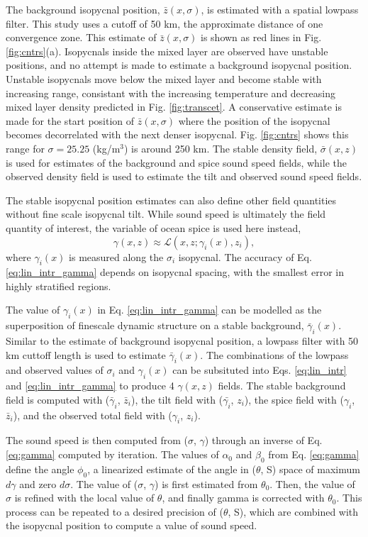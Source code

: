 \documentclass[preprint,NumberedRefs]{JASA}
\begin{document}
The background isopycnal position, $\bar{z}(x, \sigma)$, is estimated with a spatial lowpass filter. This study uses a cutoff of 50 km, the approximate distance of one convergence zone. This estimate of $\bar{z}(x, \sigma)$ is shown as red lines in Fig. \ref{fig:cntrs}(a). Isopycnals inside the mixed layer are observed have unstable positions, and no attempt is made to estimate a background isopycnal position. Unstable isopycnals move below the mixed layer and become stable with increasing range, consistant with the increasing temperature and decreasing mixed layer density predicted in Fig. \ref{fig:transcet}. A conservative estimate is made for the start position of $\bar{z}(x, \sigma)$ where the position of the isopycnal becomes decorrelated with the next denser isopycnal. Fig. \ref{fig:cntrs} shows this range for $\sigma=25.25$ (kg/m$^3$) is around 250 km. The stable density field, $\bar{\sigma}(x,z)$ is used for estimates of the background and spice sound speed fields, while the observed density field is used to estimate the tilt and observed sound speed fields.

The stable isopycnal position estimates can also define other field quantities without fine scale isopycnal tilt. While sound speed is ultimately the field quantity of interest, the variable of ocean spice is used here instead,
\begin{equation}
    \gamma(x, z)\approx\mathcal{L}(x, z; \gamma_i(x), z_i),
    \label{eq:lin_intr_gamma}
\end{equation}
where $\gamma_i(x)$ is measured along the $\sigma_i$ isopycnal. The accuracy of Eq. \eqref{eq:lin_intr_gamma} depends on isopycnal spacing, with the smallest error in highly stratified regions.

The value of $\gamma_i(x)$ in Eq. \eqref{eq:lin_intr_gamma} can be modelled as the superposition of finescale dynamic structure on a stable background, $\bar{\gamma}_i(x)$. Similar to the estimate of background isopycnal position, a lowpass filter with 50 km cuttoff length is used to estimate $\bar{\gamma}_i(x)$. The combinations of the lowpass and observed values of $\sigma_i$ and $\gamma_i(x)$ can be subsituted into Eqs. \eqref{eq:lin_intr} and \eqref{eq:lin_intr_gamma} to produce 4 $\gamma(x,z)$ fields. The stable background field is computed with ($\bar{\gamma}_i$, $\bar{z}_i$), the tilt field with ($\bar{\gamma_i}$, $z_i$), the spice field with ($\gamma_i$, $\bar{z}_i$), and the observed total field with ($\gamma_i$, $z_i$).

The sound speed is then computed from ($\sigma$, $\gamma$) through an inverse of Eq. \eqref{eq:gamma} computed by iteration. The values of $\alpha_0$ and $\beta_0$ from Eq. \eqref{eq:gamma} define the angle $\phi_0$, a linearized estimate of the angle in ($\theta$, S) space of maximum $d\gamma$ and zero $d\sigma$. The value of ($\sigma$, $\gamma$) is first estimated from $\theta_0$. Then, the value of $\sigma$ is refined with the local value of $\theta$, and finally gamma is corrected with $\theta_0$. This process can be repeated to a desired precision of ($\theta$, S), which are combined with the isopycnal position to compute a value of sound speed.
\end{document}
